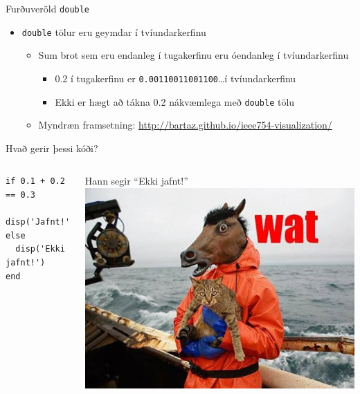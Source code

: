 \documentclass{beamer}
\begin{document}
\begin{frame}{Furðuveröld \texttt{double}}
\begin{itemize}
 \item \texttt{double} tölur eru geymdar í tvíundarkerfinu
 \begin{itemize}
  \item Sum brot sem eru endanleg í tugakerfinu eru óendanleg í tvíundarkerfinu
  \begin{itemize}
   \item 0.2 í tugakerfinu er \texttt{0.00110011001100}\ldots í tvíundarkerfinu
   \item Ekki er hægt að tákna 0.2 nákvæmlega með \texttt{double} tölu
  \end{itemize}
  \item Myndræn framsetning: \url{http://bartaz.github.io/ieee754-visualization/}
 \end{itemize}
\end{itemize}
\end{frame}

\begin{frame}[fragile]{Hvað gerir þessi kóði?}
\begin{columns}
\begin{verbatim}
if 0.1 + 0.2 == 0.3
  disp('Jafnt!')
else
  disp('Ekki jafnt!')
end
\end{verbatim}
\pause
Hann segir ``Ekki jafnt!''
\pause
\includegraphics[width=\linewidth]{Pics/wat}
\end{columns}
\end{frame}
\end{document}

